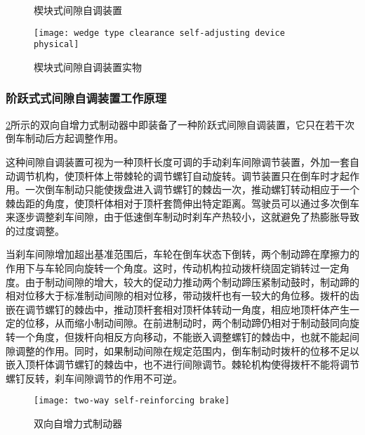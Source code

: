 \documentclass[UTF8]{ctexart}
\numberwithin{figure}{section}
\numberwithin{table}{section}
\begin{document}
\begin{figure}[htbp]
	\centering
	\begin{minipage}[b]{0.8\textwidth}
		\centering
		\caption{楔块式间隙自调装置}
		\label{wedge type clearance self-adjusting device}
	\end{minipage}
	\begin{minipage}[b]{0.5\textwidth}
		\centering
		\texttt{[image: wedge type clearance self-adjusting device physical]}
		\caption{楔块式间隙自调装置实物}
		\label{wedge type clearance self-adjusting device physical}
	\end{minipage}
\end{figure}

\subsubsection{阶跃式式间隙自调装置工作原理}

\cref{two-way self-reinforcing brake}所示的双向自增力式制动器中即装备了一种阶跃式间隙自调装置，它只在若干次倒车制动后方起调整作用。

这种间隙自调装置可视为一种顶杆长度可调的手动刹车间隙调节装置，外加一套自动调节机构，使顶杆体上带棘轮的调节螺钉自动旋转。调节装置只在倒车时才起作用。一次倒车制动只能使拨盘进入调节螺钉的棘齿一次，推动螺钉转动相应于一个棘齿距的角度，使顶杆体相对于顶杆套筒伸出特定距离。驾驶员可以通过多次倒车来逐步调整刹车间隙，由于低速倒车制动时刹车产热较小，这就避免了热膨胀导致的过度调整。

当刹车间隙增加超出基准范围后，车轮在倒车状态下倒转，两个制动蹄在摩擦力的作用下与车轮同向旋转一个角度。这时，传动机构拉动拨杆绕固定销转过一定角度。由于制动间隙的增大，较大的促动力推动两个制动蹄压紧制动鼓时，制动蹄的相对位移大于标准制动间隙的相对位移，带动拨杆也有一较大的角位移。拨杆的齿嵌在调节螺钉的棘齿中，推动顶杆套相对顶杆体转动一角度，相应地顶杆体产生一定的位移，从而缩小制动间隙。在前进制动时，两个制动蹄仍相对于制动鼓同向旋转一个角度，但拨杆向相反方向移动，不能嵌入调整螺钉的棘齿中，也就不能起间隙调整的作用。同时，如果制动间隙在规定范围内，倒车制动时拨杆的位移不足以嵌入顶杆体调节螺钉的棘齿中，也不进行间隙调节。棘轮机构使得拨杆不能将调节螺钉反转，刹车间隙调节的作用不可逆。

\begin{figure}[htbp]
	\centering
	\begin{minipage}[b]{0.6\textwidth}
		\centering
		\texttt{[image: two-way self-reinforcing brake]}
		\caption{双向自增力式制动器}
		\label{two-way self-reinforcing brake}
	\end{minipage}
\end{figure}
\end{document}
